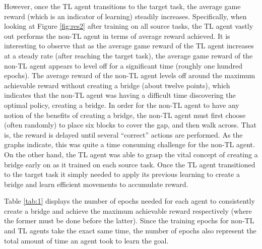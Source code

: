\documentclass{llncs}
\begin{document}

However, once the TL agent transitions to the target task, the average game reward (which is an indicator of learning) steadily increases.
Specifically, when looking at Figure \ref{fig:res2} after training on all source tasks, the TL agent vastly out performs the non-TL agent in terms of average reward achieved.
It is interesting to observe that as the average game reward of the TL agent increases at a steady rate (after reaching the target task), the average game reward of the non-TL agent appears to level off for a significant time (roughly one hundred epochs).
The average reward of the non-TL agent levels off around the maximum achievable reward without creating a bridge (about twelve points), which indicates that the non-TL agent was having a difficult time discovering the optimal policy, creating a bridge. 
In order for the non-TL agent to have any notion of the benefits of creating a bridge, the non-TL agent must first choose (often randomly) to place six blocks to cover the gap, and then walk across.
That is, the reward is delayed until several ``correct'' actions are performed. 
As the graphs indicate, this was quite a time consuming challenge for the non-TL agent. 
On the other hand, the TL agent was able to grasp the vital concept of creating a bridge early on as it trained on each source task. 
Once the TL agent transitioned to the target task it simply needed to apply its previous learning to create a bridge and learn efficient movements to accumulate reward. 

Table \ref{tab:1} displays the number of epochs needed for each agent to consistently create a bridge and achieve the maximum achievable reward respectively (where the former must be done before the latter). 
Since the training epochs for non-TL and TL agents take the exact same time, the number of epochs also represent the total amount of time an agent took to learn the goal. 
\end{document}
